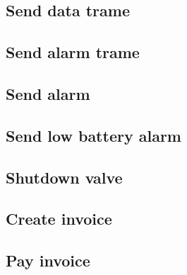 \subsection{Send data trame}
\label{uc:send-data-trame}


\subsection{Send alarm trame}
\label{uc:send-alarm-trame}


\subsection{Send alarm}
\label{uc:send-alarm}


\subsection{Send low battery alarm}
\label{uc:send-low-battery-alarm}


\subsection{Shutdown valve}
\label{uc:shutdown-valve}


\subsection{Create invoice}
\label{uc:create-invoice}


\subsection{Pay invoice}
\label{uc:pay-invoice}
